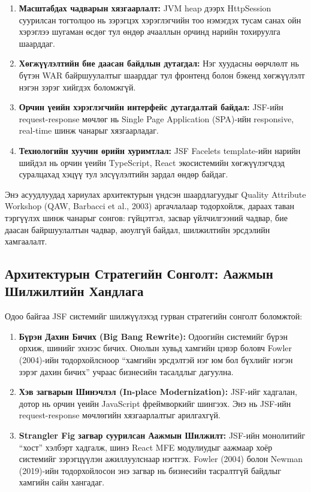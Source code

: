 \begin{enumerate}
  \item \textbf{Масштабдах чадварын хязгаарлалт:} JVM heap дээрх
    HttpSession суурилсан тогтолцоо нь зэрэгцэх хэрэглэгчийн тоо
    нэмэгдэх тусам санах ойн хэрэглээ шугаман өсдөг тул өндөр
    ачааллын орчинд нарийн тохируулга шаарддаг.
  \item \textbf{Хөгжүүлэлтийн бие даасан байдлын дутагдал:} Нэг
    хуудасны өөрчлөлт нь бүтэн WAR байршуулалтыг шаарддаг тул
    фронтенд болон бэкенд хөгжүүлэлт нэгэн зэрэг хийгдэх боломжгүй.
  \item \textbf{Орчин үеийн хэрэглэгчийн интерфейс дутагдалтай байдал:}
    JSF-ийн request-response мөчлөг нь Single Page Application (SPA)-ийн
    responsive, real-time шинж чанарыг хязгаарладаг.
  \item \textbf{Технологийн хуучин өрийн хуримтлал:} JSF Facelets
    template-ийн нарийн шийдэл нь орчин үеийн TypeScript, React
    экосистемийн хөгжүүлэгчдэд суралцахад хэцүү тул элсүүлэлтийн
    зардал өндөр байдаг.
\end{enumerate}

Энэ асуудлуудад хариулах архитектурын үндсэн шаардлагуудыг Quality
Attribute Workshop (QAW, Barbacci et al., 2003) аргачлалаар тодорхойлж,
дараах таван тэргүүлэх шинж чанарыг сонгов: гүйцэтгэл, засвар
үйлчилгээний чадвар, бие даасан байршуулалтын чадвар, аюулгүй байдал,
шилжилтийн эрсдэлийн хамгаалалт.

\subsection{Архитектурын Стратегийн Сонголт: Аажмын Шилжилтийн Хандлага}

Одоо байгаа JSF системийг шилжүүлэхэд гурван стратегийн сонголт боломжтой:

\begin{enumerate}
  \item \textbf{Бүрэн Дахин Бичих (Big Bang Rewrite):} Одоогийн системийг
    бүрэн орхиж, шинийг эхнээс бичих. Онолын хувьд хамгийн цэвэр боловч
    Fowler (2004)-ийн тодорхойлсноор ``хамгийн эрсдэлтэй нэг юм бол
    бүхлийг нэгэн зэрэг дахин бичих'' учраас бизнесийн тасалдлыг дагуулна.
  \item \textbf{Хэв загварын Шинэчлэл (In-place Modernization):} JSF-ийг
    хадгалан, дотор нь орчин үеийн JavaScript фреймворкийг шингээх.
    Энэ нь JSF-ийн request-response мөчлөгийн хязгаарлалтыг арилгахгүй.
  \item \textbf{Strangler Fig загвар суурилсан Аажмын Шилжилт:} JSF-ийн
    монолитийг ``хост'' хэлбэрт хадгалж, шинэ React MFE модулиудыг
    аажмаар хоёр системийг зэрэгцүүлэн ажиллуулснаар нэгтгэх.
    Fowler (2004) болон Newman (2019)-ийн тодорхойлосон энэ загвар нь
    бизнесийн тасралтгүй байдлыг хамгийн сайн хангадаг.
\end{enumerate}

